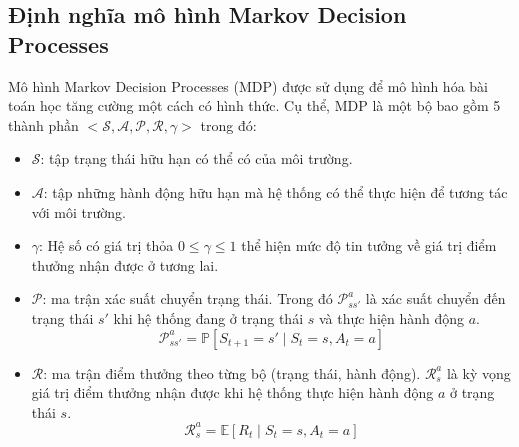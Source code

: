	\subsection{Định nghĩa mô hình Markov Decision Processes}
	Mô hình Markov Decision Processes (MDP) được sử dụng để mô hình hóa bài toán học tăng cường một cách có hình thức. Cụ thể, MDP là một bộ bao gồm 5 thành phần $<\mathcal{S, A, P, R, \gamma}>$ trong đó:
		\begin{itemize}
			\item $\mathcal{S}$: tập trạng thái hữu hạn có thể có của môi trường.
			\item $\mathcal{A}$: tập những hành động hữu hạn mà hệ thống có thể thực hiện để tương tác với môi trường.
			\item $\gamma$: Hệ số có giá trị thỏa $0\leqslant \gamma \leqslant 1$ thể hiện mức độ tin tưởng về giá trị điểm thưởng nhận được ở tương lai.
			\item $\mathcal{P}$: ma trận xác suất chuyển trạng thái. Trong đó $\mathcal{P}_{ss'}^{a}$ là xác suất chuyển đến trạng thái $s'$ khi hệ thống đang ở trạng thái $s$ và thực hiện hành động $a$.
				\begin{equation}
					\mathcal{P}_{ss'}^{a} = \mathbb{P}[\mathit{S_{t+1}} = s' \mid \mathit{S_{t}} = s, \mathit{A_{t}} = a]
				\end{equation}
			\item $\mathcal{R}$: ma trận điểm thưởng theo từng bộ (trạng thái, hành động). $\mathcal{R}_{s}^a$ là kỳ vọng giá trị điểm thưởng nhận được khi hệ thống thực hiện hành động $a$ ở trạng thái $s$.
				\begin{equation}
					\mathcal{R}_{s}^a = \mathbb{E}[\mathit{R_{t}} \mid \mathit{S_{t}} = s, \mathit{A_{t}} = a]
				\end{equation}				
		\end{itemize}
	
